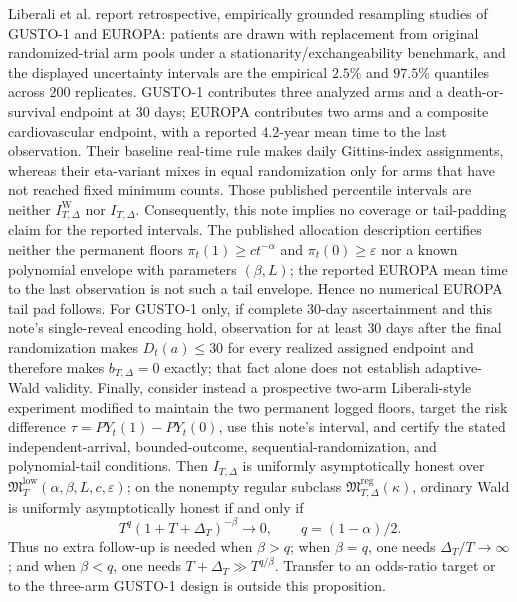 Liberali et al. \cite{LiberaliEtAl2025RTAR} report retrospective, empirically grounded resampling studies of GUSTO-1 and EUROPA: patients are drawn with replacement from original randomized-trial arm pools under a stationarity/exchangeability benchmark, and the displayed uncertainty intervals are the empirical \(2.5\%\) and \(97.5\%\) quantiles across \(200\) replicates.  GUSTO-1 contributes three analyzed arms and a death-or-survival endpoint at \(30\) days; EUROPA contributes two arms and a composite cardiovascular endpoint, with a reported \(4.2\)-year mean time to the last observation.  Their baseline real-time rule makes daily Gittins-index assignments, whereas their eta-variant mixes in equal randomization only for arms that have not reached fixed minimum counts.  Those published percentile intervals are neither \(I_{T,\Delta}^{\mathrm W}\) nor \(I_{T,\Delta}\).  Consequently, this note implies no coverage or tail-padding claim for the reported intervals.  The published allocation description certifies neither the permanent floors \(\pi_t(1)\geq ct^{-\alpha}\) and \(\pi_t(0)\geq\varepsilon\) nor a known polynomial envelope with parameters \((\beta,L)\); the reported EUROPA mean time to the last observation is not such a tail envelope.  Hence no numerical EUROPA tail pad follows.  For GUSTO-1 only, if complete \(30\)-day ascertainment and this note's single-reveal encoding hold, observation for at least \(30\) days after the final randomization makes \(D_t(a)\leq30\) for every realized assigned endpoint and therefore makes \(b_{T,\Delta}=0\) exactly; that fact alone does not establish adaptive-Wald validity.  Finally, consider instead a prospective two-arm Liberali-style experiment modified to maintain the two permanent logged floors, target the risk difference \(\tau=P Y_t(1)-P Y_t(0)\), use this note's interval, and certify the stated independent-arrival, bounded-outcome, sequential-randomization, and polynomial-tail conditions.  Then \(I_{T,\Delta}\) is uniformly asymptotically honest over \(\mathfrak M_T^{\mathrm{low}}(\alpha,\beta,L,c,\varepsilon)\); on the nonempty regular subclass \(\mathfrak M_{T,\Delta}^{\mathrm{reg}}(\kappa)\), ordinary Wald is uniformly asymptotically honest if and only if
\[
 T^q(1+T+\Delta_T)^{-\beta}\longrightarrow0,
 \qquad q=(1-\alpha)/2.
\]
Thus no extra follow-up is needed when \(\beta>q\); when \(\beta=q\), one needs \(\Delta_T/T\to\infty\); and when \(\beta<q\), one needs \(T+\Delta_T\gg T^{q/\beta}\).  Transfer to an odds-ratio target or to the three-arm GUSTO-1 design is outside this proposition.

